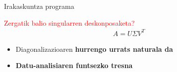 \documentclass[
 10pt,%
 compress,%
 t,       %
 xcolor=svgnames
]{beamer}
\theoremstyle{definition} \newtheorem{definicion}{Definicion}[section]
\theoremstyle{propiedades} \newtheorem{propiedades}{Propiedades}[section]
\begin{document}
\begin{frame}{Irakaskuntza programa}


\medskip



\centering \textcolor{red}{
Zergatik balio singularren deskonposaketa?}
%
\begin{align*}
A=U\Sigma V^T %
\end{align*}

\begin{itemize}
%
%

%
%
%
\item Diagonalizazioaren \textbf{hurrengo urrats naturala da}  %

%
\medskip
\item \textbf{Datu-analisiaren funtsezko tresna}  %

\medskip
%
%
%


\end{itemize}
\end{frame}
\end{document}
